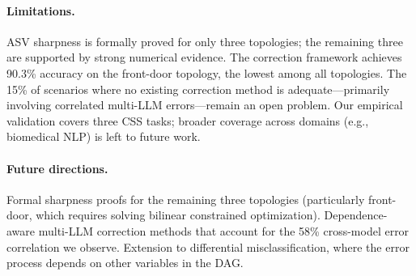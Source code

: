 \documentclass[11pt]{article}
\begin{document}
\paragraph{Limitations.}
ASV sharpness is formally proved for only three topologies; the remaining three are supported by strong numerical evidence.
The correction framework achieves 90.3\% accuracy on the front-door topology, the lowest among all topologies.
The 15\% of scenarios where no existing correction method is adequate---primarily involving correlated multi-LLM errors---remain an open problem.
Our empirical validation covers three CSS tasks; broader coverage across domains (e.g., biomedical NLP) is left to future work.

\paragraph{Future directions.}
Formal sharpness proofs for the remaining three topologies (particularly front-door, which requires solving bilinear constrained optimization).
Dependence-aware multi-LLM correction methods that account for the 58\% cross-model error correlation we observe.
Extension to differential misclassification, where the error process depends on other variables in the DAG.



\end{document}

